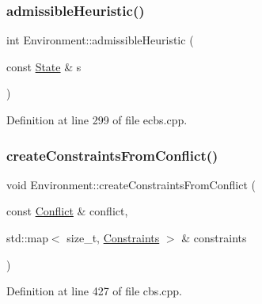 \subsubsection{\texorpdfstring{admissible\+Heuristic()}{admissibleHeuristic()}\hspace{0.1cm}{\footnotesize\ttfamily [4/4]}}
{\footnotesize\ttfamily int Environment\+::admissible\+Heuristic (\begin{DoxyParamCaption}\item[{const \hyperlink{struct_state}{State} \&}]{s }\end{DoxyParamCaption})\hspace{0.3cm}{\ttfamily [inline]}}



Definition at line 299 of file ecbs.\+cpp.

\mbox{\label{class_environment_a532b4870bfa50eb350e037dc8aa06291}} 
\subsubsection{\texorpdfstring{create\+Constraints\+From\+Conflict()}{createConstraintsFromConflict()}\hspace{0.1cm}{\footnotesize\ttfamily [1/2]}}
{\footnotesize\ttfamily void Environment\+::create\+Constraints\+From\+Conflict (\begin{DoxyParamCaption}\item[{const \hyperlink{struct_conflict}{Conflict} \&}]{conflict,  }\item[{std\+::map$<$ size\+\_\+t, \hyperlink{struct_constraints}{Constraints} $>$ \&}]{constraints }\end{DoxyParamCaption})\hspace{0.3cm}{\ttfamily [inline]}}



Definition at line 427 of file cbs.\+cpp.

\mbox{\label{class_environment_a532b4870bfa50eb350e037dc8aa06291}} 
